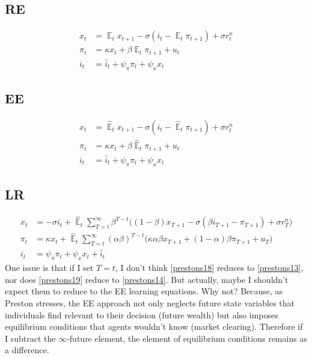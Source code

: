 \documentclass[11pt]{article}
\renewcommand{\[}{\begin{equation}}
\renewcommand{\]}{\end{equation}}
\DeclareMathOperator{\E}{\mathbb{E}}
\begin{document}
\subsection{RE}
\begin{align}
x_t &= \E_t x_{t+1} - \sigma(i_t - \E_t \pi_{t+1}) +\sigma r_t^n \label{NKIS} \\
\pi_t &= \kappa x_t +\beta \E_t \pi_{t+1} + u_t  \label{NKPC} \\
i_t &= \bar{i}_t + \psi_{\pi}\pi_t + \psi_{x} x_t  \label{TR}
\end{align}
\subsection{EE}
\begin{align}
x_t &= \hat{\E}_t x_{t+1} - \sigma(i_t - \hat{\E}_t \pi_{t+1}) +\sigma r_t^n \tag{Preston, eq. (13)} \label{prestons13} \\
\pi_t &= \kappa x_t +\beta \hat{\E}_t \pi_{t+1} + u_t \tag{Preston, eq. (14)} \label{prestons14}  \\
i_t &= \bar{i}_t + \psi_{\pi}\pi_t + \psi_{x} x_t \tag{Preston, eq. (27) } 
\end{align}
\subsection{LR}
\begin{align}
x_t &=  -\sigma i_t +\hat{\E}_t \sum_{T=t}^{\infty} \beta^{T-t }\big( (1-\beta)x_{T+1} - \sigma(\beta i_{T+1} - \pi_{T+1}) +\sigma r_T^n \big) \tag{Preston, eq. (18)} \label{prestons18}  \\
\pi_t &= \kappa x_t +\hat{\E}_t \sum_{T=t}^{\infty} (\alpha\beta)^{T-t }\big( \kappa \alpha \beta x_{T+1} + (1-\alpha)\beta \pi_{T+1} + u_T\big)\tag{Preston, eq. (19)} \label{prestons19}  \\
i_t &= \psi_{\pi}\pi_t + \psi_{x} x_t + \bar{i}_t \tag{Preston, eq. (27)} 
\end{align}
One issue is that if I set $T=t$, I don't think \ref{prestons18} reduces to \ref{prestons13}, nor does \ref{prestons19} reduce to \ref{prestons14}. But actually, maybe I shouldn't expect them to reduce to the EE learning equations. Why not? Because, as Preston stresses, the EE approach not only neglects future state variables that individuals find relevant to their decision (future wealth) but also imposes equilibrium conditions that agents wouldn't know (market clearing). Therefore if I subtract the $\infty$-future element, the element of equilibrium conditions remains as a difference.
\end{document}
